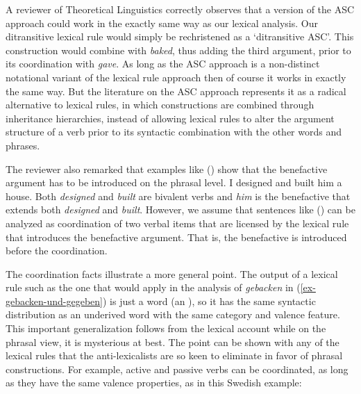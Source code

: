 
A reviewer of Theoretical Linguistics correctly observes that a version of the ASC approach could work in the exactly same way as our lexical analysis.  
Our ditransitive lexical rule would simply be rechristened as a `ditransitive ASC'.  This construction would combine with \emph{baked}, thus adding the
third argument, prior to its coordination with \emph{gave}.  As long as the ASC approach is a non-distinct notational
variant of the lexical rule approach then of course it works in exactly the same way.  But the literature on the ASC approach represents
it as a radical alternative to lexical rules, in which constructions are combined through inheritance hierarchies, instead of allowing lexical rules 
to alter the argument structure of a verb prior to its syntactic combination with the other words and phrases.  

The reviewer also remarked that examples like () show that the benefactive argument has to be
introduced on the phrasal level.
\ea
I designed and built him a house.
\z
Both \emph{designed} and \emph{built} are bivalent verbs and \emph{him} is the benefactive that
extends both \emph{designed} and \emph{built}. However, we assume that sentences like () can
be analyzed as coordination of two verbal items that are licensed by the lexical rule that
introduces the benefactive argument. That is, the benefactive is introduced before the coordination.

The coordination facts illustrate a more general point.  The output of a lexical rule such as the one that would
apply in the analysis of \emph{gebacken} in (\ref{ex-gebacken-und-gegeben}) is just a word (an
\xzero), so it has the same syntactic distribution as an underived word with the same category and
valence feature.  This important generalization follows from the lexical account while on the
phrasal view, it is mysterious at best.  The point can be shown with any of the lexical rules that
the anti-lexicalists are so keen to eliminate in favor of phrasal constructions.  For example,
active and passive verbs can be coordinated, as long as they have the same valence properties, as in
this Swedish example: 

